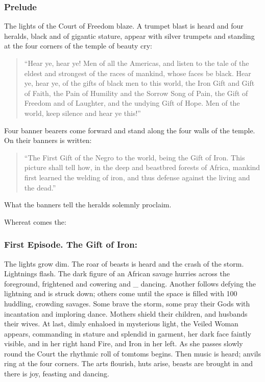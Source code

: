 \documentclass[letterpaper,10pt,english]{jupyterBook}
\begin{document}
\subsubsection{Prelude}
\label{\detokenize{Volumes/06/07/national_emancipation_exposition:prelude}}
\sphinxAtStartPar
The lights of the Court of Freedom blaze. A trumpet blast is heard and four heralds, black and of gigantic stature, appear with silver trumpets and standing at the four corners of the temple of beauty cry:
\begin{quote}

\sphinxAtStartPar
“Hear ye, hear ye! Men of all the Americas, and listen to the tale of the eldest and strongest of the races of mankind, whose faces be black. Hear ye, hear ye, of the gifts of black men to this world, the Iron Gift and Gift of Faith, the Pain of Humility and the Sorrow Song of Pain, the Gift of Freedom and of Laughter, and the undying Gift of Hope. Men of the world, keep silence and hear ye this!”
\end{quote}

\sphinxAtStartPar
Four banner bearers come forward and stand along the four walls of the temple. On their banners is written:
\begin{quote}

\sphinxAtStartPar
“The First Gift of the Negro to the world, being the Gift of Iron. This picture shall tell how, in the deep and beast\sphinxhyphen{}bred forests of Africa, mankind first learned the welding of iron, and thus defense against the living and the dead.”
\end{quote}

\sphinxAtStartPar
What the banners tell the heralds solemnly proclaim.

\sphinxAtStartPar
Whereat comes the:


\subsubsection{First Episode. The Gift of Iron:}
\label{\detokenize{Volumes/06/07/national_emancipation_exposition:first-episode-the-gift-of-iron}}
\sphinxAtStartPar
The lights grow dim. The roar of beasts is heard and the crash of the storm. Lightnings flash. The dark figure of an African savage hurries across the foreground, frightened and cowering and \_ dancing. Another follows defying the lightning and is struck down; others come until the space is filled with 100 huddling, crowding savages. Some brave the storm, some pray their Gods with incantation and imploring dance. Mothers shield their children, and husbands their wives. At last, dimly enhaloed in mysterious light, the Veiled Woman appears, commanding in stature and splendid in garment, her dark face faintly visible, and in her right hand Fire, and Iron in her left. As she passes slowly round the Court the rhythmic roll of tomtoms begins. Then music is heard; anvils ring at the four corners. The arts flourish, huts arise, beasts are brought in and there is joy, feasting and dancing.
\end{document}
